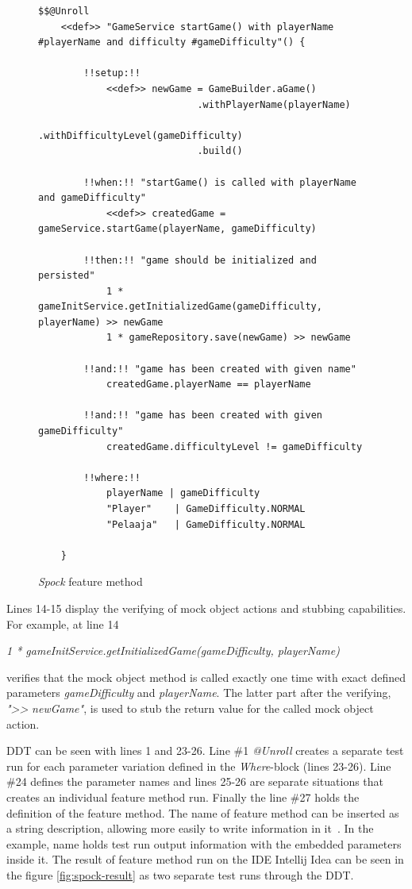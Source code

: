     \clearpage
    \begin{figure}[H]
        \begin{lstlisting}[style=java]
    $$@Unroll
    <<def>> "GameService startGame() with playerName #playerName and difficulty #gameDifficulty"() {

        !!setup:!!
            <<def>> newGame = GameBuilder.aGame()
                            .withPlayerName(playerName)
                            .withDifficultyLevel(gameDifficulty)
                            .build()

        !!when:!! "startGame() is called with playerName and gameDifficulty"
            <<def>> createdGame = gameService.startGame(playerName, gameDifficulty)

        !!then:!! "game should be initialized and persisted"
            1 * gameInitService.getInitializedGame(gameDifficulty, playerName) >> newGame
            1 * gameRepository.save(newGame) >> newGame

        !!and:!! "game has been created with given name"
            createdGame.playerName == playerName

        !!and:!! "game has been created with given gameDifficulty"
            createdGame.difficultyLevel != gameDifficulty

        !!where:!!
            playerName | gameDifficulty
            "Player"    | GameDifficulty.NORMAL
            "Pelaaja"   | GameDifficulty.NORMAL

    }
          \end{lstlisting}
        \caption{\textit{Spock} feature method}
        \label{fig:spock-example}

    \end{figure}
    Lines 14-15 display the verifying of mock object actions and stubbing capabilities.
    For example, at line 14
    \begin{center}
    \textit{1 * gameInitService.getInitializedGame(gameDifficulty, playerName)}
    \end{center}
    verifies that the mock object method is called exactly one time with exact defined parameters \textit{gameDifficulty} and \textit{playerName}.
    The latter part after the verifying, \textit{"\textgreater\textgreater} \textit{newGame"}, is used to stub the return value for the
    called mock object action.

    DDT can be seen with lines 1 and 23-26.
    Line \#1 \textit{@Unroll} creates a separate test run for each parameter
    variation defined in the \textit{Where}-block (lines 23-26). Line \#24 defines the parameter names and lines 25-26 are
    separate situations that creates an individual feature method run. Finally the line \#27 holds the definition of
    the feature method. The name of feature method can be inserted as a string description, allowing more easily to write
    information in it~\cite{kapelonis2016java}. In the example, name holds test run output information with the embedded parameters inside it.
    The result of feature method run on the IDE Intellij Idea can be seen in the figure \ref{fig:spock-result} as two separate test runs through the DDT.

